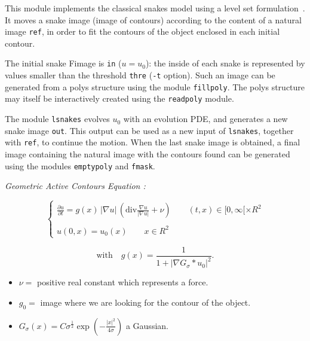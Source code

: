 This module implements the classical snakes model using a
level set formulation~\cite{caselles.catte.ea:geometric}. 
It moves a snake image 
(image of contours) according to the content of a natural image \verb+ref+, in
order to fit the contours of the object enclosed in each initial contour.

The initial snake Fimage is \verb+in+ ($ u = u_0 $): the inside of each
snake is represented by values smaller than the threshold \verb+thre+ 
(\verb+-t+ option).
Such an image can be generated from a polys structure using the module 
\verb+fillpoly+.%
The polys structure may itself be interactively created using the \verb+readpoly+ module. %

The module \verb+lsnakes+ evolves $ u_0 $ with an evolution PDE,
and generates a new snake image \verb+out+.
This output can be used as a new input of \verb+lsnakes+, together with
\verb+ref+, to continue the motion.
When the last snake image is obtained, a final image containing the natural
image with the contours found can be generated using the modules
\verb+emptypoly+ and \verb+fmask+.

\vspace{1cm}

{\em Geometric Active Contours Equation :} 
  
  $$
    \left\{
    \begin{array}{ll}
\displaystyle
    \frac {\partial u}{\partial t} = g(x) \, |\nabla u|\,
\left(\mathrm{div}\frac{\nabla u}{|\nabla u|} + \nu\right) \qquad  
    (t,x) \in {[0,\infty[ \times R^2} \\
\\
    u(0,x) = u_0(x) \qquad 
    x\in{R^2}
    \end{array}     
    \right.
  $$

$$ \mathrm{with}\quad
g(x) = \frac{1}{1+|\nabla G_\sigma \ast u_0|^2}.$$
     
\begin{itemize}
\item $ \nu = $ positive real constant which represents a force.
\item $ g_0 = $ image where we are looking for the contour of the object. 
\item $ G_\sigma(x) = C\sigma^\frac{1}{2}\exp(-\frac{|x|^2}{4\sigma}) $ a Gaussian. 
\end{itemize}
   

%

